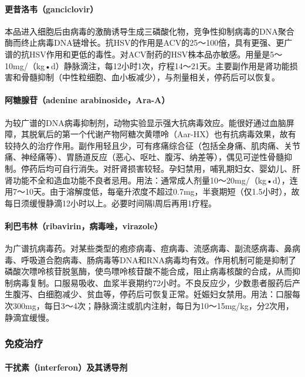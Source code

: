 \paragraph{更昔洛韦（ganciclovir）}

本品进入细胞后由病毒的激酶诱导生成三磷酸化物，竞争性抑制病毒的DNA聚合酶而终止病毒DNA链增长。抗HSV的作用是ACV的25～100倍，具有更强、更广谱的抗HSV作用和更低的毒性。对ACV耐药的HSV株本品亦敏感。用量是5～10mg/（kg•d）静脉滴注，每12小时1次，疗程14～21天。主要副作用是肾功能损害和骨髓抑制（中性粒细胞、血小板减少），与剂量相关，停药后可以恢复。

\paragraph{阿糖腺苷（adenine arabinoside，Ara-A）}

为较广谱的DNA病毒抑制剂，动物实验显示强大抗病毒效应。能很好通过血脑屏障，其脱氧后的第一个代谢产物阿糖次黄嘌呤（Aar-HX）也有抗病毒效果，故有较持久的治疗作用。副作用轻且少，可有疼痛综合征（包括全身痛、肌肉痛、关节痛、神经痛等）、胃肠道反应（恶心、呕吐、腹泻、纳差等），偶见可逆性骨髓抑制。停药后均可自行消失。对肝肾损害较轻。孕妇禁用，哺乳期妇女、婴幼儿、肝肾功能不全和造血功能不良者忌用。用法：通常成人剂量10～20mg/（kg•d），连用7～10天。由于溶解度低，每毫升浓度不超过0.7mg，半衰期短（仅1.5小时），故每日须缓慢静滴12小时以上。必要时间隔l周后再用1疗程。

\paragraph{利巴韦林（ribavirin，病毒唑，virazole）}

为广谱抗病毒药。对某些类型的疱疹病毒、痘病毒、流感病毒、副流感病毒、鼻病毒、呼吸道合胞病毒、肠病毒等DNA和RNA病毒均有效。作用机制可能是抑制了磷酸次嘌呤核苷脱氢酶，使鸟嘌呤核苷酸不能合成，阻止病毒核酸的合成，从而抑制病毒复制。口服易吸收、血浆半衰期约72小时。不良反应少，少数患者服药后产生腹泻、白细胞减少、贫血等，停药后可恢复正常。妊娠妇女禁用。用法：口服每次300mg，每日3～4次；静脉滴注或肌内注射，每日为10～15mg/kg，分2次用，静滴宜缓慢。

\subsubsection{免疫治疗}

\paragraph{干扰素（interferon）及其诱导剂}

